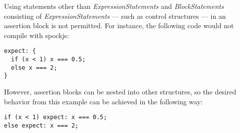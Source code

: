 Using statements other than \textit{ExpressionStatements}
and \textit{BlockStatements} consisting of \textit{ExpressionStatements}
--- such as control structures ---
in an assertion block is not permitted.
For instance, the following code would not compile with spockjs:
\begin{verbatim}
expect: {
  if (x < 1) x === 0.5;
  else x === 2;
}
\end{verbatim}
However, assertion blocks can be nested into other structures,
so the desired behavior from this example can be achieved in the following way:
\autocite{SpockjsGithub}
\begin{verbatim}
if (x < 1) expect: x === 0.5;
else expect: x === 2;
\end{verbatim}
